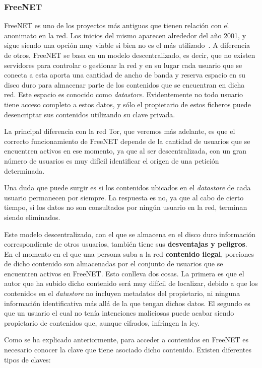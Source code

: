 \subsubsection {FreeNET}

FreeNET es uno de los proyectos más antiguos que tienen relación con el anonimato en la red. Los inicios del mismo aparecen alrededor del año 2001, y sigue siendo una opción muy viable si bien no es el más utilizado~\cite{article:freenet}. A diferencia de otros, FreeNET se basa en un modelo descentralizado, es decir, que no existen servidores para controlar o gestionar la red y en su lugar cada usuario que se conecta a esta aporta una cantidad de ancho de banda y reserva espacio en su disco duro para almacenar parte de los contenidos que se encuentran en dicha red. 
Este espacio es conocido como \textit{datastore}. Evidentemente no todo usuario tiene acceso completo a estos datos, y sólo el propietario de estos ficheros puede desencriptar sus contenidos utilizando su clave privada.

La principal diferencia con la red Tor, que veremos más adelante, es que el correcto funcionamiento de FreeNET depende de la cantidad de usuarios que se encuentren activos en ese momento, ya que al ser descentralizada, con un gran número de usuarios es muy difícil identificar el origen de una petición determinada. 

Una duda que puede surgir es si los contenidos ubicados en el \textit{datastore} de cada usuario permanecen por siempre. La respuesta es no, ya que al cabo de cierto tiempo, si los datos no son consultados por ningún usuario en la red, terminan siendo eliminados.

Este modelo descentralizado, con el que se almacena en el disco duro información correspondiente de otros usuarios, también tiene sus \textbf{desventajas y peligros}. En el momento en el que una persona suba a la red \textbf{contenido ilegal}, porciones de dicho contenido son almacenadas por el conjunto de usuarios que se encuentren activos en FreeNET. Esto conlleva dos cosas.
La primera es que el autor que ha subido dicho contenido será muy difícil de localizar, debido a que los contenidos en el \textit{datastore} no incluyen metadatos del propietario, ni ninguna información identificativa más allá de la que tengan dichos datos.
El segundo es que un usuario el cual no tenía intenciones maliciosas puede acabar siendo propietario de contenidos que, aunque cifrados, infringen la ley.

Como se ha explicado anteriormente, para acceder a contenidos en FreeNET es necesario conocer la clave que tiene asociado dicho contenido. Existen diferentes tipos de claves:

